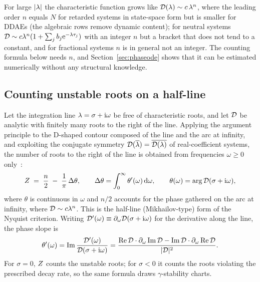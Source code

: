 For large $|\lambda|$ the characteristic function grows like
$\mathcal{D}(\lambda)\sim c\,\lambda^{n}$, where the leading order $n$ equals $N$ for
retarded systems in state-space form but is smaller for DDAEs (the algebraic
rows remove dynamic content); for neutral systems
$\mathcal{D}\sim c\lambda^{n}(1+\sum_j b_j\mathrm{e}^{-\lambda\tau_j})$ with an integer $n$ but a
bracket that does not tend to a constant, and for fractional systems $n$ is
in general not an integer. The counting formula below needs
$n$, and Section~\ref{sec:phaseode} shows that it can be estimated
numerically without any structural knowledge.

\subsection{Counting unstable roots on a half-line}\label{sec:counting}

Let the integration line $\lambda=\sigma+\mathrm{i}\omega$ be free of characteristic
roots, and let $\mathcal{D}$ be analytic with finitely many roots to the right of the
line. Applying the argument principle to the D-shaped contour composed of the
line and the arc at infinity, and exploiting the conjugate symmetry
$\mathcal{D}(\overline{\lambda})=\overline{\mathcal{D}(\lambda)}$ of real-coefficient systems,
the number of roots to the right of the line is obtained from frequencies
$\omega\ge 0$ only~\cite{stepan1989retarded,hassard1997counting}:
\begin{equation}\label{eq:count}
  Z \;=\; \frac{n}{2} \;-\; \frac{1}{\pi}\,\Delta\theta,
  \qquad
  \Delta\theta = \int_{0}^{\infty}\theta'(\omega)\,\mathrm{d}\omega,
  \qquad
  \theta(\omega) = \arg \mathcal{D}(\sigma+\mathrm{i}\omega),
\end{equation}
where $\theta$ is continuous in $\omega$ and $n/2$ accounts for the phase
gathered on the arc at infinity, where $\mathcal{D}\sim c\lambda^{n}$. This is the
half-line (Mikhailov-type) form of the Nyquist criterion. Writing
$\mathcal{D}'(\omega)\equiv\partial_\omega\mathcal{D}(\sigma+\mathrm{i}\omega)$ for the
derivative along the line, the phase slope is
\begin{equation}\label{eq:integrand}
  \theta'(\omega)
  = \operatorname{Im}\frac{\mathcal{D}'(\omega)}{\mathcal{D}(\sigma+\mathrm{i}\omega)}
  = \frac{\operatorname{Re}\mathcal{D}\cdot\partial_\omega\operatorname{Im}\mathcal{D}
        - \operatorname{Im}\mathcal{D}\cdot\partial_\omega\operatorname{Re}\mathcal{D}}{|\mathcal{D}|^{2}} .
\end{equation}
For $\sigma=0$, $Z$ counts the unstable roots; for $\sigma<0$ it counts
the roots violating the prescribed decay rate, so the same formula draws
$\gamma$-stability charts.

